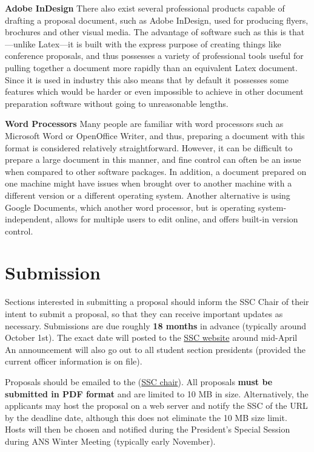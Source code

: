 \documentclass[12pt]{article}
\begin{document}
\textbf{Adobe InDesign}\newline
There also exist several professional products capable of drafting a proposal document, such as Adobe InDesign, used for producing flyers, brochures and other visual media. The advantage of software such as this is that---unlike Latex---it is built with the express purpose of creating things like conference proposals, and thus possesses a variety of professional tools useful for pulling together a document more rapidly than an equivalent Latex document. Since it is used in industry this also means that by default it possesses some features which would be harder or even impossible to achieve in other document preparation software without going to unreasonable lengths.

\textbf{Word Processors}\newline
Many people are familiar with word processors such as Microsoft Word or OpenOffice Writer, and thus, preparing a document with this format is considered relatively straightforward. However, it can be difficult to prepare a large document in this manner, and fine control can often be an issue when compared to other software packages. In addition, a document prepared on one machine might have issues when brought over to another machine with a different version or a different operating system.
Another alternative is using Google Documents, which another word processor, but is operating system-independent, allows for multiple users to edit online, and offers built-in version control.

\newpage
\section{Submission}
Sections interested in submitting a proposal should inform the SSC Chair of their intent to submit a proposal, so that they can receive important updates as necessary.
Submissions are due roughly \textbf{18 months} in advance (typically around October 1st).
The exact date will posted to the \href{http://students.ans.org/THELINK}{SSC website} around mid-April
An announcement will also go out to all student section presidents (provided the current officer information is on file). 

Proposals should be emailed to the (\href{mailto:sscChair@gmail.com}{SSC chair}). 
All proposals \textbf{must be submitted in PDF format} and are limited to 10 MB in size.
Alternatively, the applicants may host the proposal on a web server and notify the SSC of the URL by the deadline date, although this does not eliminate the 10 MB size limit.
Hosts will then be chosen and notified during the President's Special Session during ANS Winter Meeting (typically early November).
\end{document}
